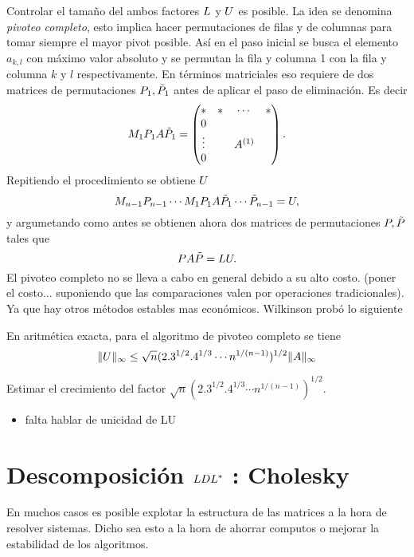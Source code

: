 \begin{tcolorbox}
Controlar el tamaño del ambos factores $\Lb$ y $\Ub$ es posible.
La idea se denomina \emph{pivoteo completo}, esto implica hacer permutaciones de filas y de columnas para tomar siempre el mayor pivot posible. Así en el paso inicial se busca el elemento $a_{k,l}$ con máximo valor absoluto y se permutan la fila y columna 1 con la fila y columna $k$ y $l$ respectivamente.  En términos matriciales eso requiere de dos matrices de permutaciones $\Pb_1,\tilde \Pb_1$ antes de aplicar el paso de eliminación. Es decir
$$
\Mb_1\Pb_1\Ab\tilde\Pb_1=
\begin{pmatrix}
 *&*&\cdots &*\\
 0&&&\\
  \vdots&&\Ab^{(1)}&\\
 0&&&\\

\end{pmatrix}.
$$
Repitiendo el procedimiento se obtiene $\Ub$
$$
\Mb_{n-1}\Pb_{n-1}\cdots \Mb_1\Pb_1\Ab\tilde\Pb_1\cdots \tilde\Pb_{n-1}=\Ub,
$$
y argumetando como antes se obtienen ahora dos matrices de permutaciones $\Pb,\tilde\Pb$ tales que
$$
\Pb\Ab\tilde\Pb=\Lb\Ub.
$$
El pivoteo completo no se lleva a cabo en general debido a su alto costo.  (poner el costo... suponiendo que las comparaciones valen por operaciones tradicionales). Ya que hay otros métodos estables mas económicos. Wilkinson probó lo siguiente
\tcc
\begin{teo}
 En aritmética exacta, para el algoritmo de pivoteo completo se tiene
 $$
 \|\Ub\|_{\infty}\le \sqrt{n}(2.3^{1/2}.4^{1/3}\cdots n^{1/(n-1)})^{1/2}\|\Ab\|_\infty
 $$
\end{teo}
\etcc
\begin{ej}
 Estimar el crecimiento del factor
 $\sqrt{n}(2.3^{1/2}.4^{1/3}\cdots n^{1/(n-1)})^{1/2}$.
\end{ej}

\begin{itemize}
 \item falta hablar de unicidad de LU
\end{itemize}

\section{Descomposición $\Lb \Db\Lb^*$ : Cholesky}


En muchos casos es posible explotar la estructura de las matrices a la hora de resolver sistemas. Dicho sea esto a la hora de ahorrar computos o mejorar la estabilidad de los algoritmos.



\end{tcolorbox}
